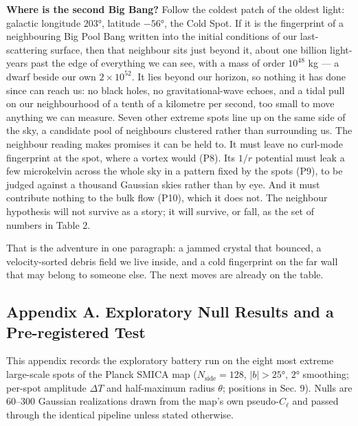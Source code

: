 \documentclass[
]{article}
\begin{document}
\textbf{Where is the second Big Bang?} Follow the coldest patch of the
oldest light: galactic longitude \(203°\), latitude \(-56°\), the Cold
Spot. If it is the fingerprint of a neighbouring Big Pool Bang written
into the initial conditions of our last-scattering surface, then that
neighbour sits just beyond it, about one billion light-years past the
edge of everything we can see, with a mass of order \(10^{48}\) kg --- a
dwarf beside our own \(2\times10^{52}\). It lies beyond our horizon, so
nothing it has done since can reach us: no black holes, no
gravitational-wave echoes, and a tidal pull on our neighbourhood of a
tenth of a kilometre per second, too small to move anything we can
measure. Seven other extreme spots line up on the same side of the sky,
a candidate pool of neighbours clustered rather than surrounding us. The
neighbour reading makes promises it can be held to. It must leave no
curl-mode fingerprint at the spot, where a vortex would (P8). Its
\(1/r\) potential must leak a few microkelvin across the whole sky in a
pattern fixed by the spots (P9), to be judged against a thousand
Gaussian skies rather than by eye. And it must contribute nothing to the
bulk flow (P10), which it does not. The neighbour hypothesis will not
survive as a story; it will survive, or fall, as the set of numbers in
Table 2.

That is the adventure in one paragraph: a jammed crystal that bounced, a
velocity-sorted debris field we live inside, and a cold fingerprint on
the far wall that may belong to someone else. The next moves are already
on the table.

\hypertarget{appendix-a.-exploratory-null-results-and-a-pre-registered-test}{%
\subsection{\texorpdfstring{\textbf{Appendix A. Exploratory Null Results
and a Pre-registered
Test}}{Appendix A. Exploratory Null Results and a Pre-registered Test}}\label{appendix-a.-exploratory-null-results-and-a-pre-registered-test}}

This appendix records the exploratory battery run on the eight most
extreme large-scale spots of the Planck SMICA map
(\(N_{\text{side}} = 128\), \(|b| > 25°\), \(2°\) smoothing; per-spot
amplitude \(\Delta T\) and half-maximum radius \(\theta\); positions in
Sec. 9). Nulls are 60--300 Gaussian realizations drawn from the map's
own pseudo-\(C_\ell\) and passed through the identical pipeline unless
stated otherwise.
\end{document}
